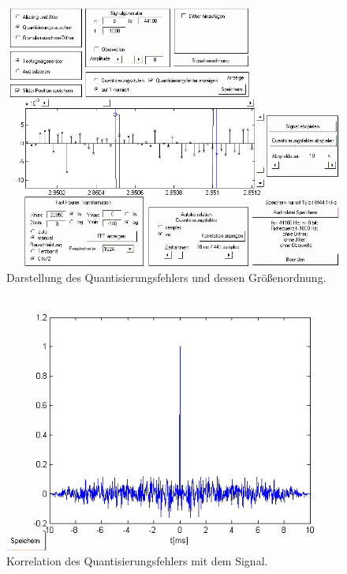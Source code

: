 \begin{figure}[h!]
\centering
\includegraphics[width=\columnwidth]{figures/Aufg1/2_1_3.JPG} 
\caption{Darstellung des Quantisierungsfehlers und dessen Größenordnung.}
\label{fig:quantfehlgroess}
\end{figure}

\begin{figure}[h!]
\centering
\includegraphics[width=\columnwidth]{figures/Aufg1/2_1_korr.JPG} 
\caption{Korrelation des Quantisierungsfehlers mit dem Signal.}
\label{fig:korrquant}
\end{figure}


